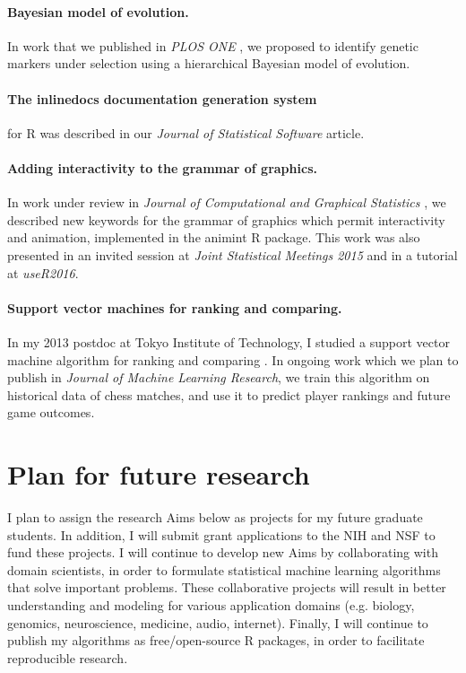 \documentclass{article}
\begin{document}
\paragraph{Bayesian model of evolution.} In work that we published in
\emph{PLOS ONE} \citep{HOCKING-evolution}, we proposed to identify
genetic markers under selection using a hierarchical Bayesian model of
evolution.

\paragraph{The inlinedocs documentation generation system} for R was
described in our \emph{Journal of Statistical Software}
\citep{hocking13:inlinedocs} article.

\paragraph{Adding interactivity to the grammar of graphics.} In work
under review in \emph{Journal of Computational and Graphical
  Statistics} \citep{animint}, we described new keywords for the
grammar of graphics which permit interactivity and animation,
implemented in the animint R package. This work was also presented in
an invited session at \emph{Joint Statistical Meetings 2015} and in a
tutorial at \emph{useR2016}.

\paragraph{Support vector machines for ranking and comparing.} In my
2013 postdoc at Tokyo Institute of Technology, I studied a support
vector machine algorithm for ranking and comparing
\citep{svmcompare}. In ongoing work which we plan to publish in
\emph{Journal of Machine Learning Research}, we train this
algorithm on historical data of chess matches, and use it to predict
player rankings and future game outcomes.

\section{Plan for future research}

I plan to assign the research Aims below as projects for my future
graduate students. In addition, I will submit grant applications to
the NIH and NSF to fund these projects. I will continue to develop new
Aims by collaborating with domain scientists, in order to formulate
statistical machine learning algorithms that solve important
problems. These collaborative projects will result in better
understanding and modeling for various application domains
(e.g. biology, genomics, neuroscience, medicine, audio,
internet). Finally, I will continue to publish my algorithms as
free/open-source R packages, in order to facilitate reproducible
research.
\end{document}

